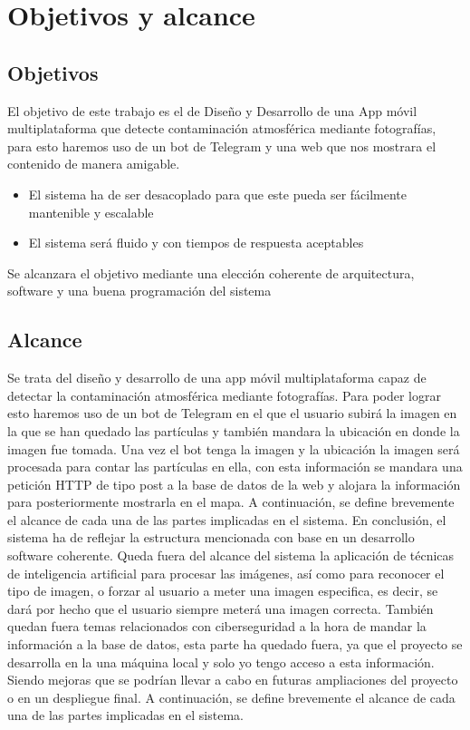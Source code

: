 \chapter{Objetivos y alcance}\label{Int}
\fancyhf{}%
\fancyfoot[L]{\thepage} 
\thispagestyle{fancy}
\section{Objetivos}
El objetivo de este trabajo es el de Diseño y Desarrollo de una App móvil
multiplataforma que detecte contaminación atmosférica mediante fotografías, para esto haremos uso de un bot de Telegram y una web que nos mostrara el contenido de manera amigable.
\begin{itemize}
    \item El sistema ha de ser desacoplado para que este pueda ser fácilmente mantenible y escalable
    \item El sistema será fluido y con tiempos de respuesta aceptables
\end{itemize}
Se alcanzara el objetivo mediante una elección coherente de arquitectura, software y una buena programación del sistema
\section{Alcance}
Se trata del diseño y desarrollo de una app móvil multiplataforma capaz de detectar la contaminación atmosférica mediante fotografías.
Para poder lograr esto haremos uso de un bot de Telegram en el que el usuario subirá la imagen en la que se han quedado las partículas y también mandara la ubicación en donde la imagen fue tomada.
Una vez el bot tenga la imagen y la ubicación la imagen será procesada para contar las partículas en ella, con esta información se mandara una petición HTTP  de tipo post a la base de datos de la web y alojara la información para posteriormente mostrarla en el mapa.
A continuación, se define brevemente el alcance de cada una de las partes implicadas en el sistema.
En conclusión, el sistema ha de reflejar la estructura mencionada con base en un desarrollo software coherente. Queda fuera del alcance del sistema la aplicación de técnicas de inteligencia artificial para procesar las imágenes, así como para reconocer el tipo de imagen, o forzar al usuario a meter una imagen especifica, es decir, se dará por hecho que el usuario siempre meterá una imagen correcta. También quedan fuera  temas relacionados con ciberseguridad a la hora de mandar la información a la base de datos, esta parte ha quedado fuera, ya que el proyecto se desarrolla en la una máquina local  y solo yo tengo acceso a esta información. Siendo mejoras que se podrían llevar a cabo en futuras ampliaciones del proyecto o en un despliegue final.
A continuación, se define brevemente el alcance de cada una de las partes implicadas en el
sistema.

